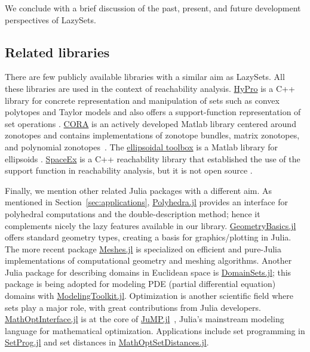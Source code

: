 We conclude with a brief discussion of the past, present, and future development perspectives of LazySets.


\subsection{Related libraries}

There are few publicly available libraries with a similar aim as LazySets.
%
All these libraries are used in the context of reachability analysis.
%
\href{https://github.com/hypro/hypro}{HyPro} is a C++ library for concrete representation and manipulation of sets such as convex polytopes and Taylor models and also offers a support-function representation of set operations \cite{SchuppAMK17}.
%
\href{https://github.com/TUMcps/CORA}{CORA} is an actively developed Matlab library centered around zonotopes and contains implementations of zonotope bundles, matrix zonotopes, and polynomial zonotopes~\cite{Althoff15}.
%
The \href{https://github.com/SystemAnalysisDpt-CMC-MSU/ellipsoids}{ellipsoidal toolbox} is a Matlab library for ellipsoids \cite{kurzhanskiy2006ellipsoidal}.
%
\href{http://spaceex.imag.fr/}{SpaceEx} is a C++ reachability library that established the use of the support function in reachability analysis, but it is not open source \cite{frehse2011spaceex}.

\smallskip

Finally, we mention other related Julia packages with a different aim.
% 
As mentioned in Section~\ref{sec:applications}, \href{https://github.com/JuliaPolyhedra/Polyhedra.jl}{Polyhedra.jl} \cite{legat2021polyhedra} provides an interface for polyhedral computations and the double-description method; hence it complements nicely the lazy features available in our library.
%
\href{https://github.com/JuliaGeometry/GeometryBasics.jl}{GeometryBasics.jl} offers standard geometry types, creating a basis for graphics/plotting in Julia.
%
The more recent package
\href{https://github.com/JuliaGeometry/Meshes.jl}{Meshes.jl} is specialized on efficient and pure-Julia implementations of computational geometry and meshing algorithms.
%
Another Julia package for describing domains in Euclidean space is \href{https://github.com/JuliaApproximation/DomainSets.jl}{DomainSets.jl}; this package is being adopted for modeling PDE (partial differential equation) domains with \href{https://github.com/SciML/ModelingToolkit.jl}{ModelingToolkit.jl}.
%
Optimization is another scientific field where sets play a major role, with great contributions from Julia developers.
%
\href{https://github.com/jump-dev/MathOptInterface.jl}{MathOptInterface.jl}
\cite{MathOptInterface-2021} is at the core of \href{https://github.com/jump-dev/JuMP.jl}{JuMP.jl}~\cite{DunningHuchetteLubin2017}, Julia's mainstream modeling language for mathematical optimization.
%
Applications include set programming in \href{https://github.com/blegat/SetProg.jl}{SetProg.jl}
and set distances in \href{https://github.com/jump-dev/MathOptSetDistances.jl}{MathOptSetDistances.jl}.


